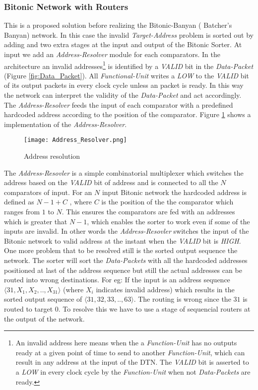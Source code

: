 				  \subsubsection{Bitonic Network with Routers}
					      This is a proposed solution before realizing the Bitonic-Banyan \cite{batcher_banyan_ref}( Batcher's Banyan)  network. In this case the invalid \textit{Target-Address} problem is sorted
					      out by adding and two extra stages at the input and output of the Bitonic Sorter. At input we add an \textit{Address-Resolver} module for each comparators. In the architecture an invalid 
					      addresses\footnote{An invalid address here means when the a \textit{Function-Unit} has no outputs ready at a given point of time to send to another \textit{Function-Unit}, 
					      which can result in any address at the input of the DTN. The \textit{VALID} bit is asserted to a \textit{LOW} in every clock cycle by the \textit{Function-Unit} when not \textit{Data-Packets} are ready.}
					      is identified by a \textit{VALID} bit in the \textit{Data-Packet} (Figure \ref{fig:Data_Packet}). All \textit{Functional-Unit} writes a \textit{LOW} to the \textit{VALID} bit of its output packets in every clock cycle unless an packet is ready. 
					      In this way the network can interpret the validity of the \textit{Data-Packet} and act accordingly. The \textit{Address-Resolver} feeds the input of each comparator with a predefined hardcoded address according to the position of the comparator. 
					      Figure \ref{fig:Address_Resolver} shows a implementation of the \textit{Address-Resolver}.
					      \begin{figure}[!ht]
							\texttt{[image: Address\_Resolver.png]}
						      \caption{Address resolution}
					      \label{fig:Address_Resolver}
					      \end{figure}
					      The \textit{Address-Resovler} is a simple combinatorial multiplexer which switches the address based on the \textit{VALID} bit of address and is connected to all the $N$ comparators of input.
					      For an $N$ input Bitonic network the hardcoded address is defined as $N -1 + C$ , where $C$ is the position of the the comparator which ranges from $1$ to $N$. This ensures the 
					      comparators are fed with an addresses which is greater that $N -1$, which enables the sorter to work even if some of the inputs are invalid. In other words the \textit{Address-Resovler}
					      switches the input of the Bitonic network to  valid address at the instant when the \textit{VALID} bit is \textit{HIGH}. One  more problem that to be resolved
					      still is the sorted output sequence the network. The sorter will sort the \textit{Data-Packets} with all the hardcoded addresses positioned at last of the address sequence but still the actual addresses can
					      be routed into wrong destinations. For eg: If the input is an address sequence $\langle31,X_{1},X_{2},..,X_{31}\rangle$ (where $X_{i}$ indicates invalid address) which results in the sorted output sequence 
					      of $\langle31,32,33,..,63\rangle$. The routing is wrong since the $31$ is routed to target $0$. To resolve this we have to use a stage of sequencial routers at the output of the network.
					      

